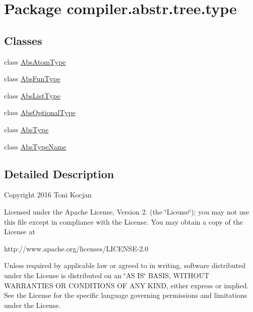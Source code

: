 \hypertarget{namespacecompiler_1_1abstr_1_1tree_1_1type}{}\section{Package compiler.\+abstr.\+tree.\+type}
\label{namespacecompiler_1_1abstr_1_1tree_1_1type}
\subsection*{Classes}
\begin{DoxyCompactItemize}
\item 
class \hyperlink{classcompiler_1_1abstr_1_1tree_1_1type_1_1_abs_atom_type}{Abs\+Atom\+Type}
\item 
class \hyperlink{classcompiler_1_1abstr_1_1tree_1_1type_1_1_abs_fun_type}{Abs\+Fun\+Type}
\item 
class \hyperlink{classcompiler_1_1abstr_1_1tree_1_1type_1_1_abs_list_type}{Abs\+List\+Type}
\item 
class \hyperlink{classcompiler_1_1abstr_1_1tree_1_1type_1_1_abs_optional_type}{Abs\+Optional\+Type}
\item 
class \hyperlink{classcompiler_1_1abstr_1_1tree_1_1type_1_1_abs_type}{Abs\+Type}
\item 
class \hyperlink{classcompiler_1_1abstr_1_1tree_1_1type_1_1_abs_type_name}{Abs\+Type\+Name}
\end{DoxyCompactItemize}


\subsection{Detailed Description}
Copyright 2016 Toni Kocjan

Licensed under the Apache License, Version 2. (the \char`\"{}\+License\char`\"{}); you may not use this file except in compliance with the License. You may obtain a copy of the License at \begin{DoxyVerb}http://www.apache.org/licenses/LICENSE-2.0
\end{DoxyVerb}


Unless required by applicable law or agreed to in writing, software distributed under the License is distributed on an \char`\"{}\+A\+S I\+S\char`\"{} B\+A\+S\+IS, W\+I\+T\+H\+O\+UT W\+A\+R\+R\+A\+N\+T\+I\+ES OR C\+O\+N\+D\+I\+T\+I\+O\+NS OF A\+NY K\+I\+ND, either express or implied. See the License for the specific language governing permissions and limitations under the License.

